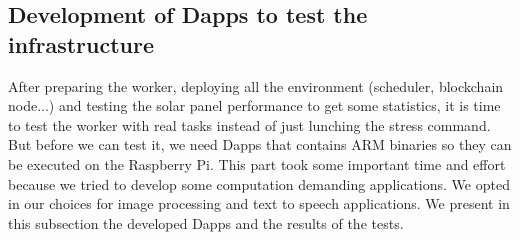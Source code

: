     \subsection{Development of Dapps to test the infrastructure}
    After preparing the worker, deploying all the environment (scheduler, blockchain node...) and testing
    the solar panel performance to get some statistics, it is time to test the worker with real tasks
    instead of just lunching the stress command. But before we can test it, we need Dapps that contains ARM
    binaries so they can be executed on the Raspberry Pi. This part took some important time and effort because
    we tried to develop some computation demanding applications. We opted in our choices for image processing
    and text to speech applications. We present in this subsection the developed Dapps and the results of the
    tests.

